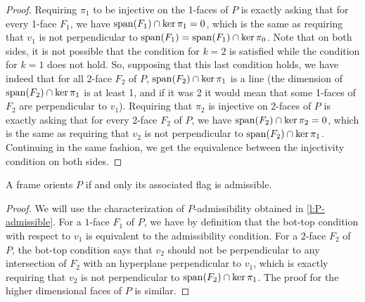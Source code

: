 \begin{proof}
	Requiring $\pi_1$ to be injective on the 1-faces of $P$ is exactly asking that for every 1-face $F_1$, we have $\operatorname{\mathrm{span}}(F_1)\cap \ker \pi_1=0$, which is the same as requiring that $v_1$ is not perpendicular to $\operatorname{\mathrm{span}}(F_1)=\operatorname{\mathrm{span}}(F_1)\cap \ker \pi_0$.
	Note that on both sides, it is not possible that the condition for $k=2$ is satisfied while the condition for $k=1$ does not hold.
	So, supposing that this last condition holds, we have indeed that for all 2-face $F_2$ of $P$, $\operatorname{\mathrm{span}}(F_2)\cap \ker \pi_1$ is a line (the dimension of $\operatorname{\mathrm{span}}(F_2)\cap \ker \pi_1$ is at least 1, and if it was 2 it would mean that some 1-faces of $F_2$ are perpendicular to $v_1$).
	Requiring that $\pi_2$ is injective on 2-faces of $P$ is exactly asking that for every 2-face $F_2$ of $P$, we have $\operatorname{\mathrm{span}}(F_2)\cap \ker \pi_2=0$, which is the same as requiring that $v_2$ is not perpendicular to $\operatorname{\mathrm{span}}(F_2)\cap \ker \pi_1$.
	Continuing in the same fashion, we get the equivalence between the injectivity condition on both sides.
\end{proof}

\begin{lemma} \label{l:bot-top-admissible}
	A frame orients $P$ if and only its associated flag is admissible.
\end{lemma}

\begin{proof}
	We will use the characterization of $P$-admissibility obtained in \cref{l:P-admissible}.
	For a $1$-face $F_1$ of $P$, we have by definition that the bot-top condition with respect to $v_1$ is equivalent to the admissibility condition.
	For a $2$-face $F_2$ of $P$, the bot-top condition says that $v_2$ should not be perpendicular to any intersection of $F_2$ with an hyperplane perpendicular to $v_1$, which is exactly requiring that $v_2$ is not perpendicular to $\operatorname{\mathrm{span}}(F_2)\cap \ker \pi_1$.
	The proof for the higher dimensional faces of $P$ is similar.
\end{proof}

